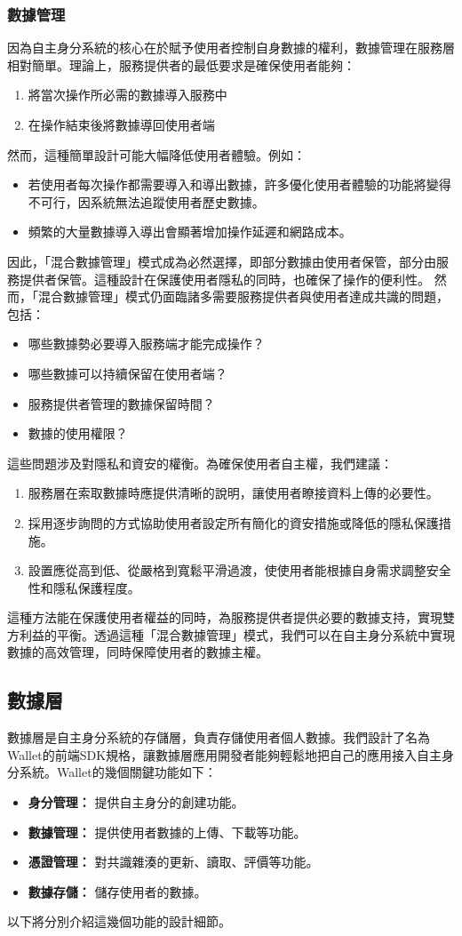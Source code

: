 \subsubsection{數據管理}
因為自主身分系統的核心在於賦予使用者控制自身數據的權利，數據管理在服務層相對簡單。理論上，服務提供者的最低要求是確保使用者能夠：
\begin{enumerate}
  \item 將當次操作所必需的數據導入服務中
  \item 在操作結束後將數據導回使用者端
\end{enumerate}
然而，這種簡單設計可能大幅降低使用者體驗。例如：
\begin{itemize}
  \item 若使用者每次操作都需要導入和導出數據，許多優化使用者體驗的功能將變得不可行，因系統無法追蹤使用者歷史數據。
  \item 頻繁的大量數據導入導出會顯著增加操作延遲和網路成本。
\end{itemize}
因此，「混合數據管理」模式成為必然選擇，即部分數據由使用者保管，部分由服務提供者保管。這種設計在保護使用者隱私的同時，也確保了操作的便利性。
然而，「混合數據管理」模式仍面臨諸多需要服務提供者與使用者達成共識的問題，包括：
\begin{itemize}
  \item 哪些數據勢必要導入服務端才能完成操作？
  \item 哪些數據可以持續保留在使用者端？
  \item 服務提供者管理的數據保留時間？
  \item 數據的使用權限？
\end{itemize}
這些問題涉及對隱私和資安的權衡。為確保使用者自主權，我們建議：
\begin{enumerate}
  \item 服務層在索取數據時應提供清晰的說明，讓使用者瞭接資料上傳的必要性。
  \item 採用逐步詢問的方式協助使用者設定所有簡化的資安措施或降低的隱私保護措施。
  \item 設置應從高到低、從嚴格到寬鬆平滑過渡，使使用者能根據自身需求調整安全性和隱私保護程度。
\end{enumerate}
這種方法能在保護使用者權益的同時，為服務提供者提供必要的數據支持，實現雙方利益的平衡。透過這種「混合數據管理」模式，我們可以在自主身分系統中實現數據的高效管理，同時保障使用者的數據主權。
\subsection{數據層}
數據層是自主身分系統的存儲層，負責存儲使用者個人數據。我們設計了名為Wallet的前端SDK規格，讓數據層應用開發者能夠輕鬆地把自己的應用接入自主身分系統。Wallet的幾個關鍵功能如下：
\begin{itemize}
  \item \textbf{身分管理：} 提供自主身分的創建功能。
  \item \textbf{數據管理：} 提供使用者數據的上傳、下載等功能。
  \item \textbf{憑證管理：} 對共識雜湊的更新、讀取、評價等功能。
  \item \textbf{數據存儲：} 儲存使用者的數據。
\end{itemize}
以下將分別介紹這幾個功能的設計細節。
